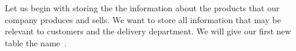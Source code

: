 %
\label{sec:factory:table:product}%
%
Let us begin with storing the the information about the products that our company produces and sells.
We want to store all information that may be relevant to customers and the delivery department.
We will give our first new table the name~.%
%
%
%
%
%
%
%
\FloatBarrier%
\endhsection%
%
